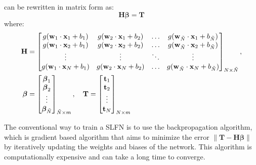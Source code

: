  can be rewritten in matrix form as:
\begin{equation}
    \textbf{H}\boldsymbol\beta = \textbf{T}
\end{equation}
where:
\begin{align}
    \textbf H &= \begin{bmatrix}
        g(\textbf w_1 \cdot \textbf x_1 + b_1) & g(\textbf w_2 \cdot \textbf x_1 + b_2) & \dots & g(\textbf w_{\tilde{N}} \cdot \textbf x_1 + b_{\tilde{N}}) \\
        g(\textbf w_1 \cdot \textbf x_2 + b_1) & g(\textbf w_2 \cdot \textbf x_2 + b_2) & \dots & g(\textbf w_{\tilde{N}} \cdot \textbf x_2 + b_{\tilde{N}}) \\
        \vdots                                 & \vdots                                 & \ddots & \vdots                                 \\
        g(\textbf w_1 \cdot \textbf x_N + b_1) & g(\textbf w_2 \cdot \textbf x_N + b_2) & \dots & g(\textbf w_{\tilde{N}} \cdot \textbf x_N + b_{\tilde{N}})
    \end{bmatrix}_{N \times \tilde{N}}, \\
    \boldsymbol\beta &= \begin{bmatrix}
        \boldsymbol\beta_1 \\
        \boldsymbol\beta_2 \\
        \vdots             \\
        \boldsymbol\beta_{\tilde{N}}
    \end{bmatrix}_{\tilde{N} \times m}, \quad
    \textbf T = \begin{bmatrix}
        \textbf t_1 \\
        \textbf t_2 \\
        \vdots      \\
        \textbf t_N
    \end{bmatrix}_{N \times m}
\end{align}

The conventional way to train a SLFN is to use the backpropagation algorithm, which is gradient
based algorithm that aims to minimize the error $\left\lVert \textbf{T} - \textbf{H}\boldsymbol\beta \right\rVert$
by iteratively updating the weights and biases of the network. This algorithm is computationally
expensive and can take a long time to converge.

